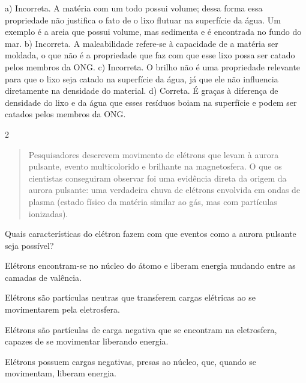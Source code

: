 {{a) Incorreta. A matéria com um todo possui volume; dessa forma essa propriedade não justifica o fato de o lixo flutuar na superfície da água. Um exemplo é a areia que possui volume, mas sedimenta e é encontrada no fundo do mar.
b) Incorreta. A maleabilidade refere-se à capacidade de a matéria ser
  moldada, o que não é a propriedade que faz com que esse lixo possa ser catado pelos membros da ONG.
c) Incorreta. O brilho não é uma propriedade relevante para que o lixo seja catado na superfície da água, já que ele não influencia diretamente na densidade do material.
d) Correta. É graças à diferença de densidade do lixo e da água que esses resíduos boiam na superfície e podem ser catados pelos membros
  da ONG.}

\num{2}

\begin{quote}
Pesquisadores descrevem movimento de elétrons que levam à aurora
pulsante, evento multicolorido e brilhante na magnetosfera. O que os
cientistas conseguiram observar foi uma evidência direta da origem da
aurora pulsante: uma verdadeira chuva de elétrons envolvida em ondas
de plasma (estado físico da matéria similar ao gás, mas com partículas
ionizadas).

\end{quote}

Quais características do elétron fazem com que eventos como a aurora
pulsante seja possível?

\begin{escolha}
\item
  Elétrons encontram-se no núcleo do átomo e liberam energia mudando entre as camadas de valência.
\item
  Elétrons são partículas neutras que transferem cargas elétricas ao se movimentarem pela eletrosfera.
\item
  Elétrons são partículas de carga negativa que se encontram na eletrosfera, capazes de se movimentar liberando energia.
\item
  Elétrons possuem cargas negativas, presas ao núcleo, que, quando se movimentam, liberam energia.
\end{escolha}

}
